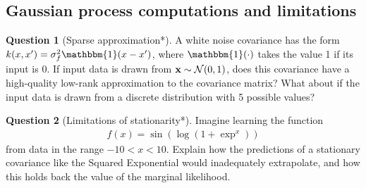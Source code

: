 \documentclass[a4paper]{article}
\theoremstyle{definition}
\newtheorem{question}{Question}
\begin{document}
\subsection{Gaussian process computations and limitations}
\begin{question}[Sparse approximation*]
\label{q:sparse-approx}
A white noise covariance has the form $k(x, x') = \sigma^2_f\mathbbm{1}\left(x - x'\right)$, where $\mathbbm{1}(\cdot)$ takes the value 1 if its input is 0. If input data is drawn from $\vx \sim \NormDist{0, 1}$, does this covariance have a high-quality low-rank approximation to the covariance matrix? What about if the input data is drawn from a discrete distribution with 5 possible values?
\end{question}

\begin{question}[Limitations of stationarity*]
\label{q:limitations-of-stationarity}
Imagine learning the function
\begin{align}
f(x) = \sin \left(\log(1+\exp^x) \right)
\end{align}
from data in the range $-10 < x < 10$. Explain how the predictions of a stationary covariance like the Squared Exponential would inadequately extrapolate, and how this holds back the value of the marginal likelihood.
\end{question}
\end{document}
